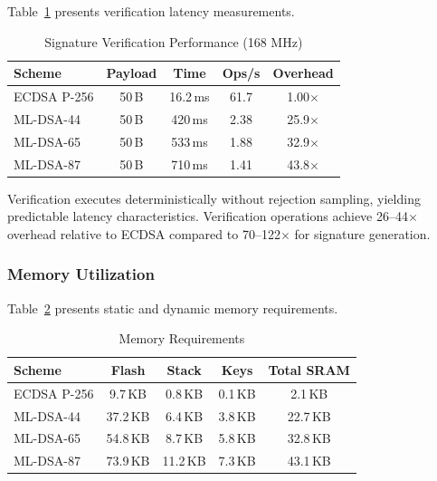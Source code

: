 \documentclass[final, twoside]{IEEEtran} %
\begin{document}
Table~\ref{tab:verify-performance} presents verification latency measurements.

\begin{table}[h]
	\centering
	\caption{Signature Verification Performance (168 MHz)}
	\label{tab:verify-performance}
	\begin{tabular}{lcccc}
		\toprule
		\textbf{Scheme} & \textbf{Payload} & \textbf{Time} & \textbf{Ops/s} & \textbf{Overhead} \\
		\midrule
		ECDSA P-256     & 50\,B            & 16.2\,ms      & 61.7           & 1.00$\times$      \\
		ML-DSA-44       & 50\,B            & 420\,ms       & 2.38           & 25.9$\times$      \\
		ML-DSA-65       & 50\,B            & 533\,ms       & 1.88           & 32.9$\times$      \\
		ML-DSA-87       & 50\,B            & 710\,ms       & 1.41           & 43.8$\times$      \\
		\bottomrule
	\end{tabular}
\end{table}

Verification executes deterministically without rejection sampling, yielding predictable latency characteristics. Verification operations achieve 26--44$\times$ overhead relative to ECDSA compared to 70--122$\times$ for signature generation.

\subsubsection{Memory Utilization}

Table~\ref{tab:memory} presents static and dynamic memory requirements.

\begin{table}[h]
	\centering
	\caption{Memory Requirements}
	\label{tab:memory}
	\begin{tabular}{lcccc}
		\toprule
		\textbf{Scheme} & \textbf{Flash} & \textbf{Stack} & \textbf{Keys} & \textbf{Total SRAM} \\
		\midrule
		ECDSA P-256     & 9.7\,KB        & 0.8\,KB        & 0.1\,KB       & 2.1\,KB             \\
		ML-DSA-44       & 37.2\,KB       & 6.4\,KB        & 3.8\,KB       & 22.7\,KB            \\
		ML-DSA-65       & 54.8\,KB       & 8.7\,KB        & 5.8\,KB       & 32.8\,KB            \\
		ML-DSA-87       & 73.9\,KB       & 11.2\,KB       & 7.3\,KB       & 43.1\,KB            \\
		\bottomrule
	\end{tabular}
\end{table}
\end{document}
